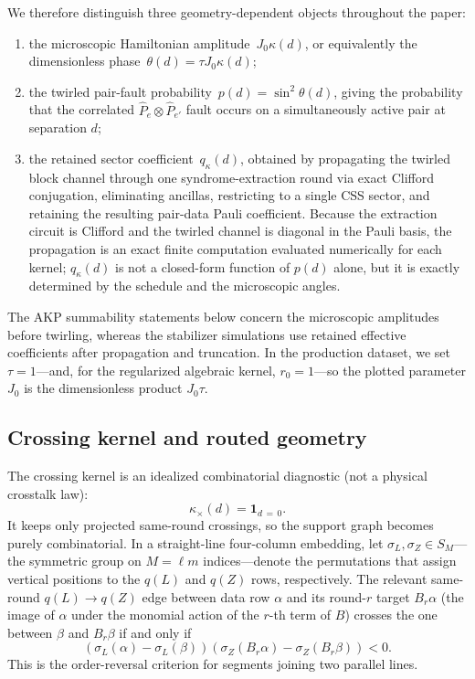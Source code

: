 \documentclass[
aps,
prx,
10pt,
twocolumn,
groupedaddress,
longbibliography,
nofootinbib,
floatfix
]{revtex4-2}
\theoremstyle{definition}
\begin{document}
We therefore distinguish three geometry-dependent objects throughout the paper:
\begin{enumerate}[label=(\roman*),leftmargin=2em]
\item the microscopic Hamiltonian amplitude~$J_0\kappa(d)$, or equivalently the dimensionless phase~${\theta(d)=\tau J_0\kappa(d)}$;
\item the twirled pair-fault probability~${p(d)=\sin^2\!\theta(d)}$, giving the probability that the correlated $\hat P_e\otimes\hat P_{e'}$ fault occurs on a simultaneously active pair at separation $d$;
\item the retained sector coefficient~$q_{\kappa}(d)$, obtained by propagating the twirled block channel through one syndrome-extraction round via exact Clifford conjugation, eliminating ancillas, restricting to a single CSS sector, and retaining the resulting pair-data Pauli coefficient. Because the extraction circuit is Clifford and the twirled channel is diagonal in the Pauli basis, the propagation is an exact finite computation evaluated numerically for each kernel; $q_\kappa(d)$ is not a closed-form function of $p(d)$ alone, but it is exactly determined by the schedule and the microscopic angles.
\end{enumerate}
The AKP summability statements below concern the microscopic amplitudes before twirling, whereas the stabilizer simulations use retained effective coefficients after propagation and truncation. In the production dataset, we set $\tau=1$—and, for the regularized algebraic kernel, $r_0=1$—so the plotted parameter $J_0$ is the dimensionless product $J_0\tau$.

\subsection{Crossing kernel and routed geometry}

The crossing kernel is an idealized combinatorial diagnostic (not a physical crosstalk law):
\begin{equation}
\kappa_{\times}(d)=\mathbf 1_{d\,=\,0}.
\end{equation}
It keeps only projected same-round crossings, so the support graph becomes purely combinatorial. In a straight-line four-column embedding, let $\sigma_L,\sigma_Z\in S_M$—the symmetric group on $M=\ell m$ indices—denote the permutations that assign vertical positions to the $q(L)$ and $q(Z)$ rows, respectively. The relevant same-round $q(L)\to q(Z)$ edge between data row $\alpha$ and its round-$r$ target $B_r\alpha$ (the image of $\alpha$ under the monomial action of the $r$-th term of $B$) crosses the one between $\beta$ and $B_r\beta$ if and only if
\begin{equation}
\left(\sigma_L(\alpha)-\sigma_L(\beta)\right)
\left(\sigma_Z(B_r\alpha)-\sigma_Z(B_r\beta)\right)<0.
\label{eq:cross-criterion}
\end{equation}
This is the order-reversal criterion for segments joining two parallel lines.
\end{document}
